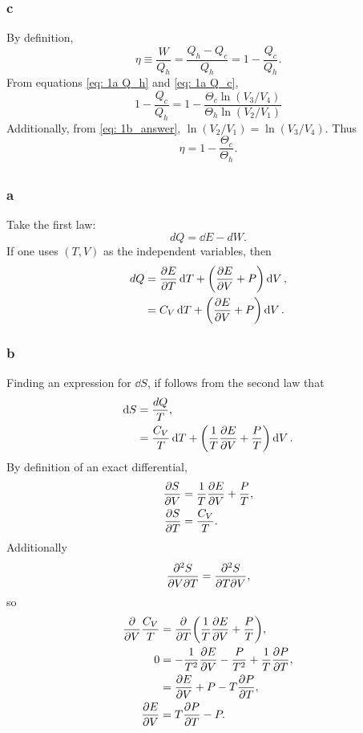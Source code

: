 \documentclass[a4paper,12pt,twoside]{article}
\begin{document}
\begin{multicols*}{2}
\subsubsection*{c}
By definition,
\begin{equation}
	\eta \equiv \frac{W}{Q_h} = \frac{Q_h-Q_c}{Q_h} = 1-\frac{Q_c}{Q_h}.
\end{equation}
From equations \ref{eq: 1a Q_h} and \ref{eq: 1a Q_c},
\begin{equation}
	1-\frac{Q_c}{Q_h} = 1-\frac{\Theta_c \ln(V_3/V_4)}{\Theta_h \ln(V_2/V_1)}
\end{equation}
Additionally, from \ref{eq: 1b_answer}, $\ln(V_2/V_1) = \ln(V_3/V_4)$.
Thus
\begin{equation}
	\eta = 1- \frac{\Theta_c}{\Theta_h}.
\end{equation}

\subsection{}%
\subsubsection*{a}
Take the first law:
\begin{equation}
	dQ = \dd{E} - dW.
\end{equation}
If one uses $(T,V)$ as the independent variables, then
\begin{align}
	dQ &= \pdv{E}{T} \dd{T} + \left( \pdv{E}{V} + P \right) \dd{V},\\
	&= C_V\dd{T} + \left( \pdv{E}{V} + P \right) \dd{V}.
\end{align}
\subsubsection*{b}
Finding an expression for $\dd{S}$, if follows from the second law that
\begin{align}
	\dd{S} &= \frac{dQ}{T},\\
	&= \frac{C_V}{T}\dd{T} + \left( \frac{1}{T}\pdv{E}{V} + \frac{P}{T} \right) \dd{V}.
\end{align}
By definition of an exact differential,
\begin{align}
	\pdv{S}{V} &= \frac{1}{T}\pdv{E}{V} + \frac{P}{T},\\
	\pdv{S}{T} &= \frac{C_V}{T}.
\end{align}
Additionally
\begin{equation}
	\pdv{S}{V}{T} = \pdv{S}{T}{V},
\end{equation}
so
\begin{align}
	\pdv{V} \frac{C_V}{T} &= \pdv{T}(\frac{1}{T}\pdv{E}{V} + \frac{P}{T}),\\
	0 &= -\frac{1}{T^2}\pdv{E}{V} - \frac{P}{T^2} + \frac{1}{T}\pdv{P}{T},\\
	&= \pdv{E}{V} + P - T\pdv{P}{T},\\
	\pdv{E}{V} &= T\pdv{P}{T} - P.
\end{align}


\end{multicols*}
\end{document}
